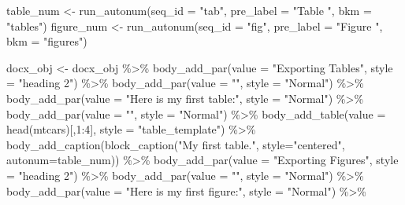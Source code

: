 \documentclass[
]{krantz}
\makeatletter
\newenvironment{Shaded}{\begin{snugshade}}{\end{snugshade}}
\newcommand{\AttributeTok}[1]{\textcolor[rgb]{0.61,0.61,0.61}{#1}}
\newcommand{\DecValTok}[1]{\textcolor[rgb]{0.06,0.06,0.06}{#1}}
\newcommand{\FunctionTok}[1]{\textcolor[rgb]{0,0,0}{#1}}
\newcommand{\NormalTok}[1]{#1}
\newcommand{\OtherTok}[1]{\textcolor[rgb]{0.37,0.37,0.37}{#1}}
\newcommand{\SpecialCharTok}[1]{\textcolor[rgb]{0,0,0}{#1}}
\newcommand{\StringTok}[1]{\textcolor[rgb]{0.5,0.5,0.5}{#1}}
\newenvironment{kframe}{%
\medskip{}
\setlength{\fboxsep}{.8em}
 \def\at@end@of@kframe{}%
 \ifinner\ifhmode%
  \def\at@end@of@kframe{\end{minipage}}%
  \begin{minipage}{\columnwidth}%
 \fi\fi%
 \def\FrameCommand##1{\hskip\@totalleftmargin \hskip-\fboxsep
 \colorbox{shadecolor}{##1}\hskip-\fboxsep
     \hskip-\linewidth \hskip-\@totalleftmargin \hskip\columnwidth}%
 \MakeFramed {\advance\hsize-\width
   \@totalleftmargin\z@ \linewidth\hsize
   \@setminipage}}%
 {\par\unskip\endMakeFramed%
 \at@end@of@kframe}
\renewenvironment{Shaded}{\begin{kframe}}{\end{kframe}}
\makeatother
\begin{document}
\begin{Shaded}
\begin{Highlighting}[]
\NormalTok{table\_num }\OtherTok{\textless{}{-}} \FunctionTok{run\_autonum}\NormalTok{(}\AttributeTok{seq\_id =} \StringTok{"tab"}\NormalTok{, }\AttributeTok{pre\_label =} \StringTok{"Table "}\NormalTok{, }\AttributeTok{bkm =} \StringTok{"tables"}\NormalTok{)}
\NormalTok{figure\_num }\OtherTok{\textless{}{-}} \FunctionTok{run\_autonum}\NormalTok{(}\AttributeTok{seq\_id =} \StringTok{"fig"}\NormalTok{, }\AttributeTok{pre\_label =} \StringTok{"Figure "}\NormalTok{, }\AttributeTok{bkm =} \StringTok{"figures"}\NormalTok{)}

\NormalTok{docx\_obj }\OtherTok{\textless{}{-}}\NormalTok{ docx\_obj }\SpecialCharTok{\%\textgreater{}\%} 
  \FunctionTok{body\_add\_par}\NormalTok{(}\AttributeTok{value =} \StringTok{"Exporting Tables"}\NormalTok{, }\AttributeTok{style =} \StringTok{"heading 2"}\NormalTok{) }\SpecialCharTok{\%\textgreater{}\%} 
  \FunctionTok{body\_add\_par}\NormalTok{(}\AttributeTok{value =} \StringTok{""}\NormalTok{, }\AttributeTok{style =} \StringTok{"Normal"}\NormalTok{) }\SpecialCharTok{\%\textgreater{}\%} 
  \FunctionTok{body\_add\_par}\NormalTok{(}\AttributeTok{value =} \StringTok{"Here is my first table:"}\NormalTok{, }\AttributeTok{style =} \StringTok{"Normal"}\NormalTok{) }\SpecialCharTok{\%\textgreater{}\%} 
  \FunctionTok{body\_add\_par}\NormalTok{(}\AttributeTok{value =} \StringTok{""}\NormalTok{, }\AttributeTok{style =} \StringTok{"Normal"}\NormalTok{) }\SpecialCharTok{\%\textgreater{}\%} 
  \FunctionTok{body\_add\_table}\NormalTok{(}\AttributeTok{value =} \FunctionTok{head}\NormalTok{(mtcars)[,}\DecValTok{1}\SpecialCharTok{:}\DecValTok{4}\NormalTok{], }\AttributeTok{style =} \StringTok{"table\_template"}\NormalTok{) }\SpecialCharTok{\%\textgreater{}\%} 
  \FunctionTok{body\_add\_caption}\NormalTok{(}\FunctionTok{block\_caption}\NormalTok{(}\StringTok{"My first table."}\NormalTok{, }\AttributeTok{style=}\StringTok{"centered"}\NormalTok{, }\AttributeTok{autonum=}\NormalTok{table\_num)) }\SpecialCharTok{\%\textgreater{}\%} 
  \FunctionTok{body\_add\_par}\NormalTok{(}\AttributeTok{value =} \StringTok{"Exporting Figures"}\NormalTok{, }\AttributeTok{style =} \StringTok{"heading 2"}\NormalTok{) }\SpecialCharTok{\%\textgreater{}\%} 
  \FunctionTok{body\_add\_par}\NormalTok{(}\AttributeTok{value =} \StringTok{""}\NormalTok{, }\AttributeTok{style =} \StringTok{"Normal"}\NormalTok{) }\SpecialCharTok{\%\textgreater{}\%} 
  \FunctionTok{body\_add\_par}\NormalTok{(}\AttributeTok{value =} \StringTok{"Here is my first figure:"}\NormalTok{, }\AttributeTok{style =} \StringTok{"Normal"}\NormalTok{) }\SpecialCharTok{\%\textgreater{}\%} 

\end{Highlighting}
\end{Shaded}
\end{document}
